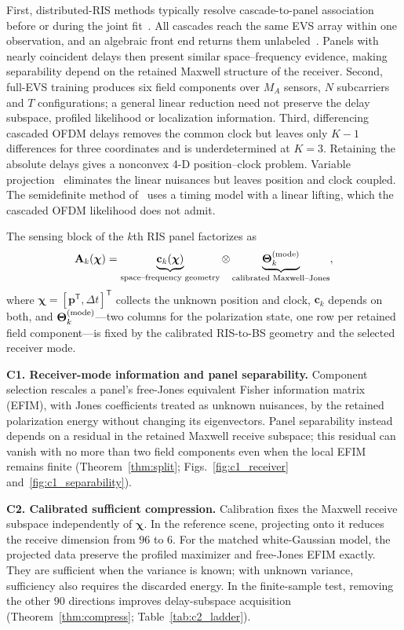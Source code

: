 \documentclass[letterpaper,journal]{IEEEtran}
\newcommand{\bp}{\mathbf{p}}
\newcommand{\bc}{\mathbf{c}}
\newcommand{\bA}{\mathbf{A}}
\newcommand{\bTheta}{\boldsymbol{\Theta}}
\newcommand{\bchi}{\boldsymbol{\chi}}
\begin{document}
First, distributed-RIS methods typically resolve cascade-to-panel association
before or during the joint
fit~\cite{ma2023distributed,liu2025multiris,fascista2022rissync}. All
cascades reach the same EVS array within one observation, and an algebraic
front end returns them unlabeled~\cite{lin2021tensor}. Panels with nearly
coincident delays then present similar space--frequency evidence, making
separability depend on the retained Maxwell structure of the receiver.
Second, full-EVS training produces six field components over $M_A$ sensors,
$N$ subcarriers and $T$ configurations; a general linear reduction need not
preserve the delay subspace, profiled likelihood or localization information.
Third, differencing cascaded OFDM delays removes the common clock but leaves
only $K-1$ differences for three coordinates and is underdetermined at $K=3$.
Retaining the absolute delays gives a nonconvex 4-D position--clock problem.
Variable projection~\cite{golub1973varpro} eliminates the linear nuisances but
leaves position and clock coupled. The semidefinite method
of~\cite{peng2025sdp} uses a timing model with a linear lifting, which the
cascaded OFDM likelihood does not admit.

The sensing block of the $k$th RIS panel factorizes as
\begin{equation}
	\bA_k(\bchi)=
	\underbrace{\bc_k(\bchi)}_{\text{space--frequency geometry}}
	\otimes
	\underbrace{\bTheta_k^{({\rm mode})}}_{\text{calibrated Maxwell--Jones}},
	\label{eq:premise}
\end{equation}
where $\bchi=[\bp^{\mathsf T},\Delta t]^{\mathsf T}$ collects the unknown
position and clock, $\bc_k$ depends on both, and
$\bTheta_k^{({\rm mode})}$---two columns for the polarization state, one row
per retained field component---is fixed by the calibrated RIS-to-BS geometry
and the selected receiver mode.

\textbf{C1. Receiver-mode information and panel separability.} Component
selection rescales a panel's free-Jones equivalent Fisher information matrix
(EFIM), with Jones coefficients treated as unknown nuisances, by the retained
polarization energy without
changing its eigenvectors. Panel separability instead depends on a residual
in the retained Maxwell receive subspace; this residual can vanish with no
more than two field components even when the local EFIM remains finite
(Theorem~\ref{thm:split}; Figs.~\ref{fig:c1_receiver}
and~\ref{fig:c1_separability}).

\textbf{C2. Calibrated sufficient compression.} Calibration fixes the Maxwell
receive subspace independently of $\bchi$. In the reference scene, projecting
onto it reduces the receive dimension from $96$ to $6$. For the matched
white-Gaussian model, the projected data preserve the profiled maximizer and
free-Jones EFIM exactly. They are sufficient when the variance is known;
with unknown variance, sufficiency also requires the discarded energy.
In the finite-sample test, removing
the other $90$ directions improves delay-subspace acquisition
(Theorem~\ref{thm:compress}; Table~\ref{tab:c2_ladder}).
\end{document}
